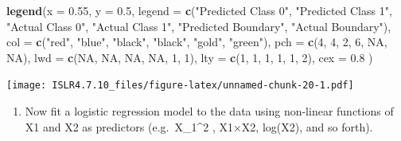 \documentclass[
]{article}
\newenvironment{Shaded}{\begin{snugshade}}{\end{snugshade}}
\newcommand{\AttributeTok}[1]{\textcolor[rgb]{0.13,0.29,0.53}{#1}}
\newcommand{\ConstantTok}[1]{\textcolor[rgb]{0.56,0.35,0.01}{#1}}
\newcommand{\DecValTok}[1]{\textcolor[rgb]{0.00,0.00,0.81}{#1}}
\newcommand{\FloatTok}[1]{\textcolor[rgb]{0.00,0.00,0.81}{#1}}
\newcommand{\FunctionTok}[1]{\textcolor[rgb]{0.13,0.29,0.53}{\textbf{#1}}}
\newcommand{\NormalTok}[1]{#1}
\newcommand{\StringTok}[1]{\textcolor[rgb]{0.31,0.60,0.02}{#1}}
\providecommand{\tightlist}{%
  \setlength{\itemsep}{0pt}\setlength{\parskip}{0pt}}
\begin{document}
\begin{Shaded}
\begin{Highlighting}[]
\FunctionTok{legend}\NormalTok{(}\AttributeTok{x =} \FloatTok{0.55}\NormalTok{, }\AttributeTok{y =} \FloatTok{0.5}\NormalTok{, }
       \AttributeTok{legend =} \FunctionTok{c}\NormalTok{(}\StringTok{"Predicted Class 0"}\NormalTok{, }\StringTok{"Predicted Class 1"}\NormalTok{, }
                  \StringTok{"Actual Class 0"}\NormalTok{, }\StringTok{"Actual Class 1"}\NormalTok{, }\StringTok{"Predicted Boundary"}\NormalTok{, }\StringTok{"Actual Boundary"}\NormalTok{), }
       \AttributeTok{col =} \FunctionTok{c}\NormalTok{(}\StringTok{"red"}\NormalTok{, }\StringTok{"blue"}\NormalTok{, }\StringTok{"black"}\NormalTok{, }\StringTok{"black"}\NormalTok{, }\StringTok{"gold"}\NormalTok{, }\StringTok{"green"}\NormalTok{), }
       \AttributeTok{pch =} \FunctionTok{c}\NormalTok{(}\DecValTok{4}\NormalTok{, }\DecValTok{4}\NormalTok{, }\DecValTok{2}\NormalTok{, }\DecValTok{6}\NormalTok{, }\ConstantTok{NA}\NormalTok{, }\ConstantTok{NA}\NormalTok{),}
       \AttributeTok{lwd =} \FunctionTok{c}\NormalTok{(}\ConstantTok{NA}\NormalTok{, }\ConstantTok{NA}\NormalTok{, }\ConstantTok{NA}\NormalTok{, }\ConstantTok{NA}\NormalTok{, }\DecValTok{1}\NormalTok{, }\DecValTok{1}\NormalTok{),}
       \AttributeTok{lty =} \FunctionTok{c}\NormalTok{(}\DecValTok{1}\NormalTok{, }\DecValTok{1}\NormalTok{, }\DecValTok{1}\NormalTok{, }\DecValTok{1}\NormalTok{, }\DecValTok{1}\NormalTok{, }\DecValTok{2}\NormalTok{),}
       \AttributeTok{cex =} \FloatTok{0.8}
\NormalTok{       )}
\end{Highlighting}
\end{Shaded}

\texttt{[image: ISLR4.7.10\_files/figure-latex/unnamed-chunk-20-1.pdf]}

\begin{enumerate}
\def\labelenumi{(\alph{enumi})}
\setcounter{enumi}{4}
\tightlist
\item
  Now fit a logistic regression model to the data using non-linear
  functions of X1 and X2 as predictors (e.g.~X\_1\^{}2 , X1×X2, log(X2),
  and so forth).
\end{enumerate}
\end{document}
